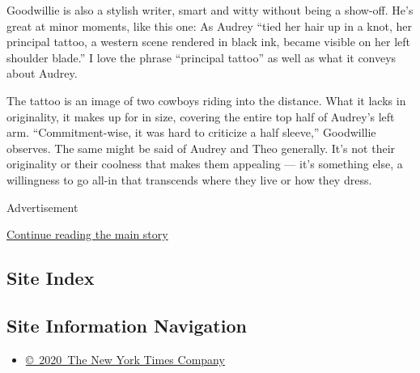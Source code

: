 Goodwillie is also a stylish writer, smart and witty without being a
show-off. He's great at minor moments, like this one: As Audrey ``tied
her hair up in a knot, her principal tattoo, a western scene rendered in
black ink, became visible on her left shoulder blade.'' I love the
phrase ``principal tattoo'' as well as what it conveys about Audrey.

The tattoo is an image of two cowboys riding into the distance. What it
lacks in originality, it makes up for in size, covering the entire top
half of Audrey's left arm. ``Commitment-wise, it was hard to criticize a
half sleeve,'' Goodwillie observes. The same might be said of Audrey and
Theo generally. It's not their originality or their coolness that makes
them appealing --- it's something else, a willingness to go all-in that
transcends where they live or how they dress.

Advertisement

\protect\hyperlink{after-bottom}{Continue reading the main story}

\hypertarget{site-index}{%
\subsection{Site Index}\label{site-index}}

\hypertarget{site-information-navigation}{%
\subsection{Site Information
Navigation}\label{site-information-navigation}}

\begin{itemize}
\tightlist
\item
  \href{https://help.nytimes.com/hc/en-us/articles/115014792127-Copyright-notice}{©~2020~The
  New York Times Company}
\end{itemize}

